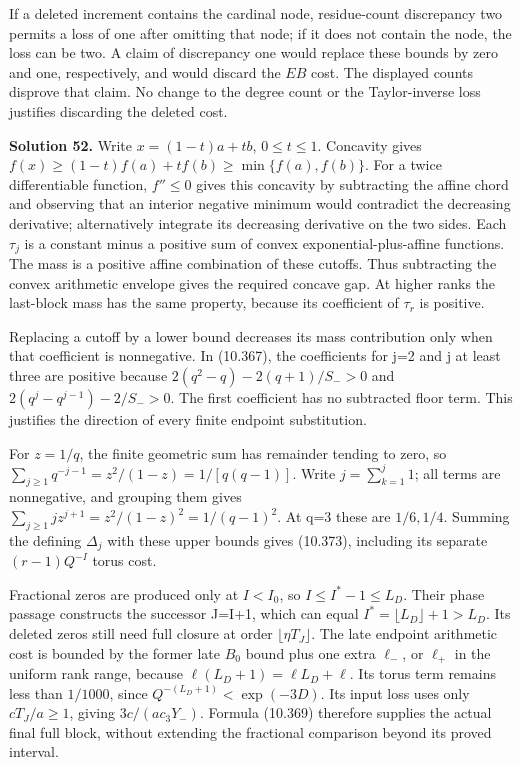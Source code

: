 \documentclass[
  11pt,
  a4paper,
]{article}
\begin{document}
If a deleted increment contains the cardinal node, residue-count
discrepancy two permits a loss of one after omitting that node; if it
does not contain the node, the loss can be two. A claim of discrepancy
one would replace these bounds by zero and one, respectively, and would
discard the \(EB\) cost. The displayed counts disprove that claim. No
change to the degree count or the Taylor-inverse loss justifies
discarding the deleted cost.

\textbf{Solution 52.} Write \(x=(1-t)a+tb\), \(0\le t\le1\). Concavity
gives \(f(x)\ge(1-t)f(a)+tf(b)\ge\min\{f(a),f(b)\}\). For a twice
differentiable function, \(f''\le0\) gives this concavity by subtracting
the affine chord and observing that an interior negative minimum would
contradict the decreasing derivative; alternatively integrate its
decreasing derivative on the two sides. Each \(\tau_j\) is a constant
minus a positive sum of convex exponential-plus-affine functions. The
mass is a positive affine combination of these cutoffs. Thus subtracting
the convex arithmetic envelope gives the required concave gap. At higher
ranks the last-block mass has the same property, because its coefficient
of \(\tau_r\) is positive.

Replacing a cutoff by a lower bound decreases its mass contribution only
when that coefficient is nonnegative. In (10.367), the coefficients for
j=2 and j at least three are positive because \(2(q^2-q)-2(q+1)/S_->0\)
and \(2(q^j-q^{j-1})-2/S_->0\). The first coefficient has no subtracted
floor term. This justifies the direction of every finite endpoint
substitution.

For \(z=1/q\), the finite geometric sum has remainder tending to zero,
so \(\sum_{j\ge1}q^{-j-1}=z^2/(1-z)=1/[q(q-1)]\). Write
\(j=\sum_{k=1}^j1\); all terms are nonnegative, and grouping them gives
\(\sum_{j\ge1}jz^{j+1}=z^2/(1-z)^2=1/(q-1)^2\). At q=3 these are
\(1/6,1/4\). Summing the defining \(\Delta_j\) with these upper bounds
gives (10.373), including its separate \((r-1)Q^{-I}\) torus cost.

Fractional zeros are produced only at \(I<I_0\), so
\(I\le I^*-1\le L_D\). Their phase passage constructs the successor
J=I+1, which can equal \(I^*=\lfloor L_D\rfloor+1>L_D\). Its deleted
zeros still need full closure at order \(\lfloor\eta T_J\rfloor\). The
late endpoint arithmetic cost is bounded by the former late \(B_0\)
bound plus one extra \(\ell_-\), or \(\ell_+\) in the uniform rank
range, because \(\ell(L_D+1)=\ell L_D+\ell\). Its torus term remains
less than \(1/1000\), since \(Q^{-(L_D+1)}<\exp(-3D)\). Its input loss
uses only \(cT_J/a\ge1\), giving \(3c/(ac_3Y_-)\). Formula (10.369)
therefore supplies the actual final full block, without extending the
fractional comparison beyond its proved interval.
\end{document}
